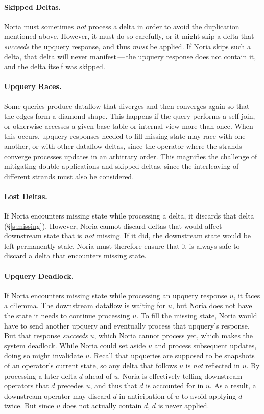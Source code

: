 \paragraph{Skipped Deltas.}
Noria must sometimes \emph{not} process a delta in order to avoid the
duplication mentioned above. However, it must do so carefully, or it might skip
a delta that \emph{succeeds} the upquery response, and thus \emph{must} be
applied. If Noria skips such a delta, that delta will never manifest\,---\,the
upquery response does not contain it, and the delta itself was skipped.

\paragraph{Upquery Races.}
Some queries produce dataflow that diverges and then converges again so that the
edges form a diamond shape. This happens if the query performs a self-join, or
otherwise accesses a given base table or internal view more than once. When
this occurs, upquery responses needed to fill missing state may race with one
another, or with other dataflow deltas, since the operator where the strands
converge processes updates in an arbitrary order. This magnifies the challenge
of mitigating double applications and skipped deltas, since the interleaving of
different strands must also be considered.

\paragraph{Lost Deltas.}
If Noria encounters missing state while processing a delta, it discards that
delta (\S\ref{s:missing}). However, Noria cannot discard deltas that would
affect downstream state that is \emph{not} missing. If it did, the downstream
state would be left permanently stale. Noria must therefore ensure that it is
always safe to discard a delta that encounters missing state.

\paragraph{Upquery Deadlock.}
If Noria encounters missing state while processing an upquery response $u$, it
faces a dilemma. The downstream dataflow is waiting for $u$, but Noria does not
have the state it needs to continue processing $u$. To fill the missing state,
Noria would have to send another upquery and eventually process that upquery's
response. But that response \emph{succeeds} $u$, which Noria cannot process yet,
which makes the system deadlock. While Noria could set aside $u$ and process
subsequent updates, doing so might invalidate $u$. Recall that upqueries are
supposed to be snapshots of an operator's current state, so any delta that
follows $u$ is \emph{not} reflected in $u$. By processing a later delta $d$
ahead of $u$, Noria is effectively telling downstream operators that $d$
precedes $u$, and thus that $d$ is accounted for in $u$. As a result, a
downstream operator may discard $d$ in anticipation of $u$ to avoid applying $d$
twice. But since $u$ does not actually contain $d$, $d$ is never applied.

